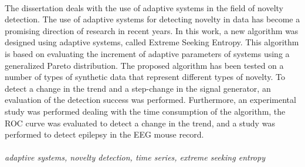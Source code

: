 \cleardoublepage
\thispagestyle{empty}

 \\ [5mm] 
The dissertation deals with the use of adaptive systems in the field of novelty detection. The use of adaptive systems for detecting novelty in data has become a promising direction of research in recent years. In this work, a new algorithm was designed using adaptive systems, called Extreme Seeking Entropy. This algorithm is based on evaluating the increment of adaptive parameters of systems using a generalized Pareto distribution. The proposed algorithm has been tested on a number of types of synthetic data that represent different types of novelty. To detect a change in the trend and a step-change in the signal generator, an evaluation of the detection success was performed. Furthermore, an experimental study was performed dealing with the time consumption of the algorithm, the ROC curve was evaluated to detect a change in the trend, and a study was performed to detect epilepsy in the EEG mouse record.
\\ [5mm]



  \\ [5mm]
{\it adaptive systems, novelty detection, time series, extreme seeking entropy}




\cleardoublepage
\tableofcontents
\thispagestyle{empty}


\cleardoublepage
\thispagestyle{empty}

